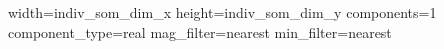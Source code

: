 width={{indiv_som_dim_x}}
height={{indiv_som_dim_y}}
components=1
component_type=real
mag_filter=nearest
min_filter=nearest
